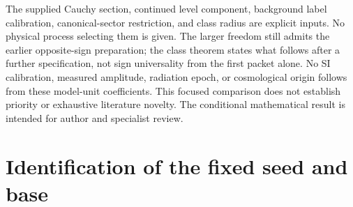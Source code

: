 \documentclass[11pt]{article}
\begin{document}
The supplied Cauchy section, continued level component, background label
calibration, canonical-sector restriction, and class radius are explicit
inputs. No physical process selecting them is given. The larger freedom
still admits the earlier opposite-sign preparation; the class theorem
states what follows after a further specification, not sign universality
from the first packet alone. No SI calibration, measured amplitude,
radiation epoch, or cosmological origin follows from these model-unit
coefficients. This focused comparison does not establish priority or
exhaustive literature novelty. The conditional mathematical result is
intended for author and specialist review.

\appendix
\section{Identification of the fixed seed and base}\label{app:base}
\end{document}
